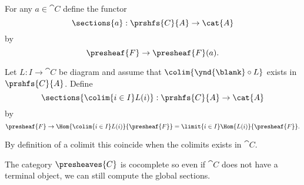 \begin{definition}
For any $a\in \cat{C}$ define the functor 
\[\sections{a}: \prshfs{C}{A} \rightarrow \cat{A}\]
by
\[\presheaf{F} \rightarrow \presheaf{F}(a).\]

Let $L:I\rightarrow \cat{C}$ be diagram 
and assume that $\colim{\ynd{\blank}\circ L}$ exists in $\prshfs{C}{A}$.
Define 
\[\sections{\colim{i\in I} L(i)}: \prshfs{C}{A} \rightarrow \cat{A}\] %
by
\[\presheaf{F} \rightarrow \Hom{\colim{i\in I} L(i)}{\presheaf{F}} = \limit{i\in I} \Hom{L(i)} {\presheaf{F}}.\]

By definition of a colimit this coincide when the colimits exists in $\cat{C}$.
\end{definition}

\begin{remark}
The category $\presheaves{C}$ is cocomplete 
so even if $\cat{C}$ does not have a terminal object, 
we can still compute the global sections.
\end{remark}